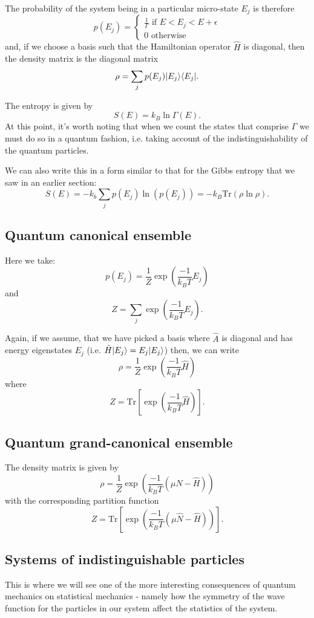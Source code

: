 The probability of the system being in a particular micro-state $E_j$ is therefore
$$
	p(E_j) =
	\begin{cases}
		\frac{1}{\Gamma} \text{ if } E<E_j<E+\epsilon\\
		0 \text{ otherwise}
	\end{cases}
$$
and, if we choose a basis such that the Hamiltonian operator $\hat{H}$ is diagonal, then the density matrix is the diagonal matrix
$$
	\rho = \sum_j p(E_j) | E_j \rangle\langle E_j |.
$$

The entropy is given by
$$
	S(E) = k_B\ln\Gamma(E).
$$
At this point, it's worth noting that when we count the states that comprise $\Gamma$ we must do so in a quantum fashion, i.e. taking account of the indistinguishability of the quantum particles.

We can also write this in a form similar to that for the Gibbs entropy that we saw in an earlier section:
$$
	S(E) = -k_b\sum_jp(E_j)\ln(p(E_j))=-k_B\text{Tr}(\rho\ln\rho).
$$ 

\subsection{Quantum canonical ensemble}
Here we take:
$$
	p(E_j) = \frac{1}{Z}\exp\left(\frac{-1}{k_BT}E_j\right)
$$
and
$$
	Z = \sum_j \exp\left(\frac{-1}{k_BT}E_j\right).
$$

Again, if we assume, that we have picked a basis where $\hat{A}$ is diagonal and has energy eigenstates $E_j$ (i.e. $\hat{H}| E_j \rangle = E_j| E_j \rangle$) then, we can write
$$
	\rho = \frac{1}{Z}\exp\left(\frac{-1}{k_BT}\hat{H}\right)
$$
where
$$
	Z = \text{Tr}\left[\exp\left(\frac{-1}{k_BT}\hat{H}\right)\right].
$$

\subsection{Quantum grand-canonical ensemble}
The density matrix is given by
$$
	\rho = \frac{1}{Z}\exp\left(\frac{-1}{k_BT}(\mu\hat{N}-\hat{H})\right)
$$
with the corresponding partition function
$$
	Z = \text{Tr}\left[\exp\left(\frac{-1}{k_BT}(\mu\hat{N}-\hat{H})\right)\right].
$$

\subsection{Systems of indistinguishable particles}
This is where we will see one of the more interesting consequences of quantum mechanics on statistical mechanics - namely how the symmetry of the wave function for the particles in our system affect the statistics of the system.

